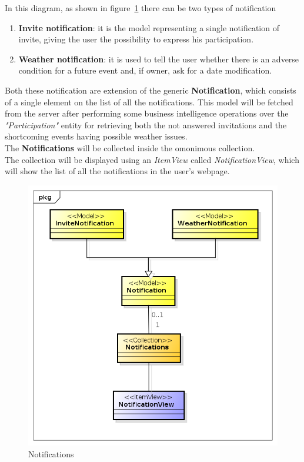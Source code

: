 In this diagram, as shown in figure~\ref{fig:notifMVC} there can be two types of notification\\
\begin{enumerate}
\item {\bf Invite notification}: it is the model representing a single notification of invite, giving the user the possibility to express his participation.
\item {\bf Weather notification}: it is used to tell the user whether there is an adverse condition for a future event and, if owner, ask for a date modification.
\end{enumerate}
Both these notification are extension of the generic \textbf{Notification}, which consists of a single element on the list of all the notifications. This model will be fetched from the server after performing some business intelligence operations over the \textit{"Participation"} entity for retrieving both the not answered invitations and the shortcoming events having possible weather issues.\\
The \textbf{Notifications} will be collected inside the omonimous collection.\\
The collection will be displayed using an \textit{ItemView} called \textit{NotificationView}, which will show the list of all the notifications in the user's webpage.
\begin{center}
 \begin{figure}[H]
    \includegraphics[width=1\textwidth]{../MVCDiagram/MVCBackbone/Notifications.png}
    \caption{Notifications}
     \label{fig:notifMVC}
     \end{figure}
   \end{center}
   
